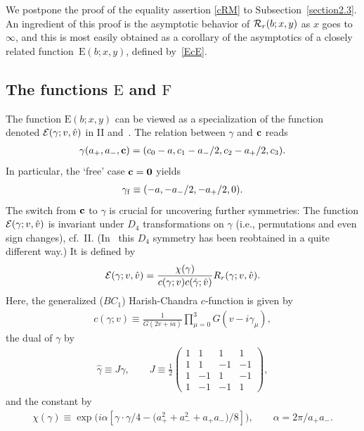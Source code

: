 \documentclass[11pt]{article}
\numberwithin{equation}{section}
\newcommand{\cE}{{\cal E}}
\newcommand{\cR}{{\cal R}}
\newcommand{\rE}{{\mathrm E}}
\newcommand{\rF}{{\mathrm F}}
\newcommand{\aaa}{a_{+},a_{-}}
\begin{document}
We postpone the proof of the equality assertion \eqref{cRM} to Subsection~\ref{section2.3}. An ingredient of this proof is the asymptotic behavior of $\cR_r(b;x,y)$ as $x$ goes to $\infty$, and this is most easily obtained as a corollary of the asymptotics of a closely related function~$\rE(b;x,y)$, def\/ined by~\eqref{EcE}.

\subsection[The functions $\rE$ and $\rF$]{The functions $\boldsymbol{\rE}$ and $\boldsymbol{\rF}$}\label{section2.2}

The function $\rE(b;x,y)$ can be viewed as a specialization of the function denoted $\cE(\gamma;v,\hat{v})$ in II and~\cite{Rsurv}. The relation between $\gamma$ and ${\bf c}$ reads
\begin{gather}\label{gamc}
\gamma(\aaa,{\bf c})=(c_0-a,c_1-a_{-}/2,c_2-a_{+}/2,c_3).
\end{gather}
In particular, the `free' case ${\bf c}={\bf 0}$ yields
\begin{gather}\label{gamf}
\gamma_{\rm f}\equiv (-a,-a_{-}/2,-a_{+}/2,0).
\end{gather}
The switch from ${\bf c}$ to $\gamma$ is crucial for uncovering further symmetries: The function $\cE(\gamma;v,\hat{v})$ is invariant under $D_4$ transformations on $\gamma$ (i.e., permutations and even sign changes), cf.~II. (In~\cite{bust} this $D_4$ symmetry has been reobtained in a quite dif\/ferent way.) It is def\/ined by
\begin{gather}
\cE(\gamma;v,\hat{v})=\frac{\chi(\gamma)}{c(\gamma;v)c(\hat{\gamma};\hat{v})}R_r(\gamma;v,\hat{v}).
\end{gather}
Here, the generalized ($BC_1$) Harish-Chandra $c$-function is given by
\begin{gather}\label{c}
c(\gamma;v)\equiv \frac{1}{G(2v+ia)}\prod_{\mu =0}^3G(v-i\gamma_{\mu}),
\end{gather}
the dual of $\gamma$ by
\begin{gather}\label{dualgam}
\hat{\gamma}\equiv J\gamma,\qquad
J\equiv \frac{1}{2} \left( \begin{array}{rrrr}
1  &  1  &  1  &  1  \\
1  &  1  &  -1  &  -1  \\
1  &  -1  &  1  &  -1  \\
1  &  -1  &  -1  &  1
\end{array} \right) ,
\end{gather}
and the constant by
\begin{gather}\label{chigam}
\chi(\gamma) \equiv \exp\big(i\alpha [\gamma\cdot \gamma /4-\big(a_{+}^2+a_{-}^2+a_{+}a_{-}\big)/8]\big),\qquad
\alpha =2\pi/a_{+}a_{-}.
\end{gather}
\end{document}
